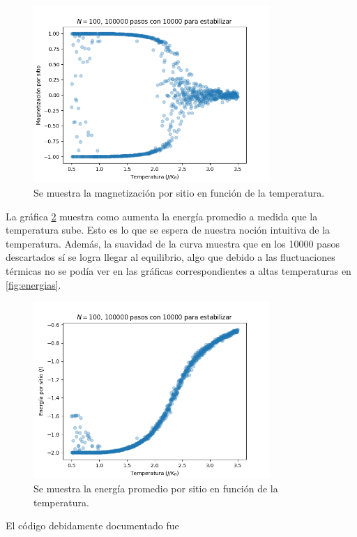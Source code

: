 \documentclass{article}
\begin{document}
\begin{figure}
\centering
\includegraphics[width = 0.8\textwidth]{magnetizacion.png}
\caption{\label{fig:magnetizacion}Se muestra la magnetización por sitio en función de la temperatura.}
\end{figure}

La gráfica \ref{fig:energia} muestra como aumenta la energía promedio a medida que la temperatura sube. Esto es lo que se espera de nuestra noción intuitiva de la temperatura. Además, la suavidad de la curva muestra que en los 10000 pasos descartados sí se logra llegar al equilibrio, algo que debido a las fluctuaciones térmicas no se podía ver en las gráficas correspondientes a altas temperaturas en  \ref{fig:energias}.

\begin{figure}
\centering
\includegraphics[width = 0.8\textwidth]{energia.png}
\caption{\label{fig:energia}Se muestra la energía promedio por sitio en función de la temperatura.}
\end{figure}

El código debidamente documentado fue

\end{document}
